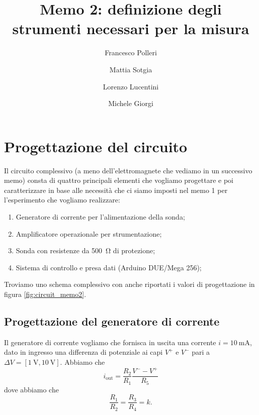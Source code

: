 \documentclass[fleqn,varvw]{memo}
\begin{document}
\title{Memo 2: definizione degli strumenti necessari per la misura}

\author{Francesco Polleri}
\author{Mattia Sotgia}


\author{Lorenzo Lucentini}
\author{Michele Giorgi}

\revised{\today}

\begin{abstract}

\end{abstract}
\maketitle

\section{Progettazione del circuito}

Il circuito complessivo (a meno dell'elettromagnete che vediamo in un successivo memo) consta di quattro principali elementi che vogliamo progettare e poi caratterizzare in base alle necessità che ci siamo imposti nel memo 1 per l'esperimento che vogliamo realizzare: \begin{enumerate}[1.]
    \item Generatore di corrente per l'alimentazione della sonda;
    \item Amplificatore operazionale per strumentazione;
    \item Sonda con resistenze da \SI{500}{\ohm} di protezione;
    \item Sistema di controllo e presa dati (Arduino DUE/Mega 256);
\end{enumerate}

Troviamo uno schema complessivo con anche riportati i valori di progettazione in figura \ref{fig:circuit_memo2}.

\subsection{Progettazione del generatore di corrente}

Il generatore di corrente vogliamo che fornisca in uscita una corrente $i=\SI{10}{\milli\ampere}$, dato in ingresso una differenza di potenziale ai capi $V^+$ e $V^-$ pari a $\Delta V = [\SI{1}{\volt}, \SI{10}{\volt}]$. Abbiamo che \begin{equation}
    i_\text{out} = \frac{R_2}{R_1}\frac{V^--V^+}{R_5}\label{eq:gen}
\end{equation} dove abbiamo che \[\frac{R_1}{R_2} = \frac{R_3}{R_4}=k.\]
\end{document}

